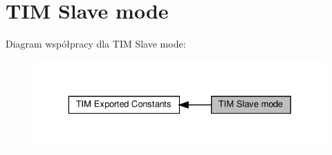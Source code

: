 \hypertarget{group___t_i_m___slave___mode}{}\section{T\+IM Slave mode}
\label{group___t_i_m___slave___mode}
Diagram współpracy dla T\+IM Slave mode\+:\nopagebreak
\begin{figure}[H]
\begin{center}
\leavevmode
\includegraphics[width=329pt]{group___t_i_m___slave___mode}
\end{center}
\end{figure}
